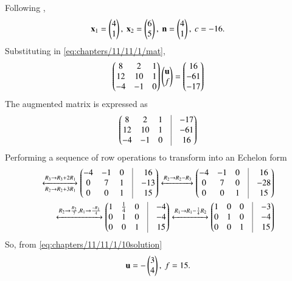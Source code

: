 	Following 
,
\begin{align}
	\label{eq:chapters/11/11/1/10circPoints}
	\mathbf{x}_{1} = \begin{pmatrix}4\\1\end{pmatrix},\ \mathbf{x}_{2} = \begin{pmatrix}6\\5\end{pmatrix},\
	\mathbf{n} = \begin{pmatrix}4 \\ 1\end{pmatrix},\  c= -16.
\end{align}
Substituting  in
	\eqref{eq:chapters/11/11/1/mat},
\begin{align}
	\begin{pmatrix}
	        8 &  2 & 1\\
	       12 & 10 & 1\\
-4 & -1 & 0\end{pmatrix}
	\begin{pmatrix}\mathbf{u}\\f\end{pmatrix} = 
	\begin{pmatrix}16 \\ -61 \\ -17\end{pmatrix}
\end{align}
The augmented matrix is expressed as
\begin{align}
	\myvec{
	        8 &  2 & 1 & \vrule & -17\\
	       12 & 10 & 1 & \vrule & -61\\
-4 & -1 & 0 & \vrule & 16}
\end{align}
Performing a sequence of row operations to transform into an Echelon form
\begin{align*}
	\xleftrightarrow[R_2\rightarrow R_2+3R_1]{{R_3\rightarrow R_3+2R_1}}
	\myvec{-4 & -1 & 0 & \vrule & 16\\
	        0 &  7 & 1 & \vrule & -13\\
	        0 &  0 & 1 & \vrule & 15}
	\xleftrightarrow[]{{R_2\rightarrow R_2-R_3}}
	\myvec{-4 & -1 & 0 & \vrule & 16\\
	        0 &  7 & 0 & \vrule & -28\\
	        0 &  0 & 1 & \vrule & 15}\\
	\xleftrightarrow[]{{R_2\rightarrow \frac{R_2}{7},R_1\rightarrow \frac{-R_1}{4}}}
	\myvec{ 1 & \frac{1}{4} & 0 & \vrule & -4\\
	        0 &  1 & 0 & \vrule & -4\\
	        0 &  0 & 1 & \vrule & 15}
	\label{eq:chapters/11/11/1/10solution}	
	\xleftrightarrow[]{{R_1\rightarrow R_1-\frac{1}{4}R_2}}
	\myvec{ 1 &  0 & 0 & \vrule & -3\\
	        0 &  1 & 0 & \vrule & -4\\
	        0 &  0 & 1 & \vrule & 15}
\end{align*}
So, from \eqref{eq:chapters/11/11/1/10solution}
\begin{align}
	\mathbf{u} = -\begin{pmatrix}3\\4\end{pmatrix},\
	f = 15.
\end{align}
